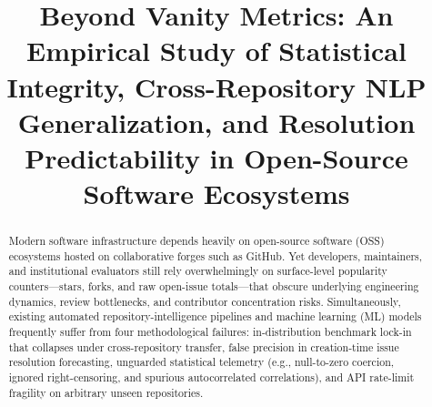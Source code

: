 \documentclass[conference]{IEEEtran}
\begin{document}
\title{Beyond Vanity Metrics: An Empirical Study of Statistical Integrity, Cross-Repository NLP Generalization, and Resolution Predictability in Open-Source Software Ecosystems}

\author{
}

\maketitle

\begin{abstract}
Modern software infrastructure depends heavily on open-source software (OSS) ecosystems hosted on collaborative forges such as GitHub. Yet developers, maintainers, and institutional evaluators still rely overwhelmingly on surface-level popularity counters---stars, forks, and raw open-issue totals---that obscure underlying engineering dynamics, review bottlenecks, and contributor concentration risks. Simultaneously, existing automated repository-intelligence pipelines and machine learning (ML) models frequently suffer from four methodological failures: in-distribution benchmark lock-in that collapses under cross-repository transfer, false precision in creation-time issue resolution forecasting, unguarded statistical telemetry (e.g., null-to-zero coercion, ignored right-censoring, and spurious autocorrelated correlations), and API rate-limit fragility on arbitrary unseen repositories.


\end{abstract}
\end{document}
